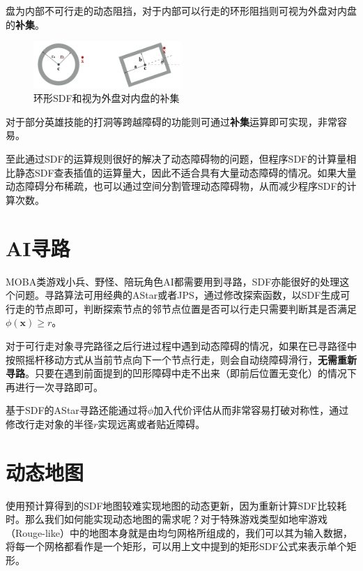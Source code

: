 盘为内部不可行走的动态阻挡，对于内部可以行走的环形阻挡则可视为外盘对内盘的\textbf{补集}。

\begin{figure}
\centering
\includegraphics[width=0.5\textwidth,height=\textheight]{环形SDF.png}
\caption{环形SDF和视为外盘对内盘的补集}
\end{figure}

对于部分英雄技能的打洞等跨越障碍的功能则可通过\textbf{补集}运算即可实现，非常容易。

至此通过SDF的运算规则很好的解决了动态障碍物的问题，但程序SDF的计算量相比静态SDF查表插值的运算量大，因此不适合具有大量动态障碍的情况。如果大量动态障碍分布稀疏，也可以通过空间分割管理动态障碍物，从而减少程序SDF的计算次数。

\hypertarget{aiux5bfbux8def}{%
\section{AI寻路}\label{aiux5bfbux8def}}

MOBA类游戏小兵、野怪、陪玩角色AI都需要用到寻路，SDF亦能很好的处理这个问题。寻路算法可用经典的AStar或者JPS，通过修改探索函数，以SDF生成可行走的节点即可，判断探索节点的邻节点位置是否可以行走只需要判断其是否满足\(\phi(\mathbf{x}) \geq r\)。

对于可行走对象寻完路径之后行进过程中遇到动态障碍的情况，如果在已寻路径中按照摇杆移动方式从当前节点向下一个节点行走，则会自动绕障碍滑行，\textbf{无需重新寻路}。只要在遇到前面提到的凹形障碍中走不出来（即前后位置无变化）的情况下再进行一次寻路即可。

基于SDF的AStar寻路还能通过将\(\phi\)加入代价评估从而非常容易打破对称性，通过修改行走对象的半径\(r\)实现远离或者贴近障碍。

\hypertarget{ux52a8ux6001ux5730ux56fe}{%
\section{动态地图}\label{ux52a8ux6001ux5730ux56fe}}

使用预计算得到的SDF地图较难实现地图的动态更新，因为重新计算SDF比较耗时。那么我们如何能实现动态地图的需求呢？对于特殊游戏类型如地牢游戏（Rouge-like）中的地图本身就是由均匀网格所组成的，我们可以其为输入数据，将每一个网格都看作是一个矩形，可以用上文中提到的矩形SDF公式来表示单个矩形。

